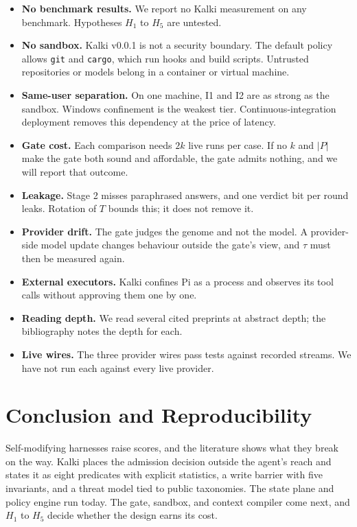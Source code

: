 \documentclass[11pt,a4paper]{article}
\begin{document}
\begin{itemize}
\item \textbf{No benchmark results.} We report no Kalki measurement on any benchmark. Hypotheses $H_1$ to $H_5$ are untested.
\item \textbf{No sandbox.} Kalki v0.0.1 is not a security boundary. The default policy allows \texttt{git} and \texttt{cargo}, which run hooks and build scripts. Untrusted repositories or models belong in a container or virtual machine.
\item \textbf{Same-user separation.} On one machine, I1 and I2 are as strong as the sandbox. Windows confinement is the weakest tier. Continuous-integration deployment removes this dependency at the price of latency.
\item \textbf{Gate cost.} Each comparison needs $2k$ live runs per case. If no $k$ and $|P|$ make the gate both sound and affordable, the gate admits nothing, and we will report that outcome.
\item \textbf{Leakage.} Stage 2 misses paraphrased answers, and one verdict bit per round leaks. Rotation of $T$ bounds this; it does not remove it.
\item \textbf{Provider drift.} The gate judges the genome and not the model. A provider-side model update changes behaviour outside the gate's view, and $\tau$ must then be measured again.
\item \textbf{External executors.} Kalki confines Pi as a process and observes its tool calls without approving them one by one.
\item \textbf{Reading depth.} We read several cited preprints at abstract depth; the bibliography notes the depth for each.
\item \textbf{Live wires.} The three provider wires pass tests against recorded streams. We have not run each against every live provider.
\end{itemize}

\section{Conclusion and Reproducibility}
\label{sec:conclusion}

Self-modifying harnesses raise scores, and the literature shows what they break on the way. Kalki places the admission decision outside the agent's reach and states it as eight predicates with explicit statistics, a write barrier with five invariants, and a threat model tied to public taxonomies. The state plane and policy engine run today. The gate, sandbox, and context compiler come next, and $H_1$ to $H_5$ decide whether the design earns its cost.
\end{document}
